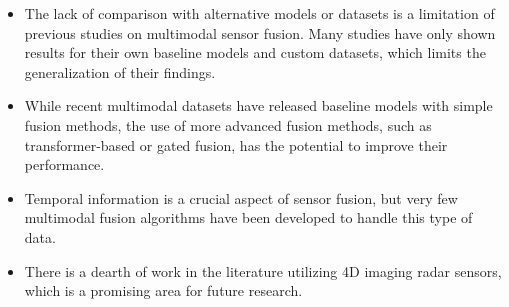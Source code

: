 \documentclass[rnd]{mas_proposal}
\begin{document}
\begin{itemize}
      \item The lack of comparison with alternative models or datasets is a limitation of previous studies on multimodal sensor fusion. Many studies have only shown results for their own baseline models and custom datasets, which limits the generalization of their findings.
      
      \item While recent multimodal datasets have released baseline models with simple fusion methods, the use of more advanced fusion methods, such as transformer-based or gated fusion, has the potential to improve their performance.

      \item Temporal information is a crucial aspect of sensor fusion, but very few multimodal fusion algorithms have been developed to handle this type of data. \cite{bijelic2020seeing}

      \item There is a dearth of work in the literature utilizing 4D imaging radar sensors, which is a promising area for future research. \cite{Zhou2022May}




\end{itemize}
\end{document}
